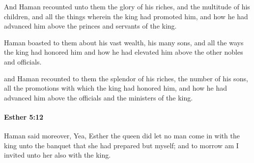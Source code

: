 			\begin{versebox}
					\item[BHS] 
					\item[LXX] 
					\item[ASV] And Haman recounted unto them the glory of his riches, and the multitude of his children, and all the things wherein the king had promoted him, and how he had advanced him above the princes and servants of the king.
					\item[NIV] Haman boasted to them about his vast wealth, his many sons, and all the ways the king had honored him and how he had elevated him above the other nobles and officials.
					\item[NRSV] and Haman recounted to them the splendor of his riches, the number of his sons, all the promotions with which the king had honored him, and how he had advanced him above the officials and the ministers of the king.
			\end{versebox}

		\paragraph{Esther 5:12} %
			\label{ESTHER-5-12}

			Haman said moreover, Yea, Esther the queen did let no man come in with the king unto the banquet that she had prepared but myself; and to morrow am I invited unto her also with the king.

